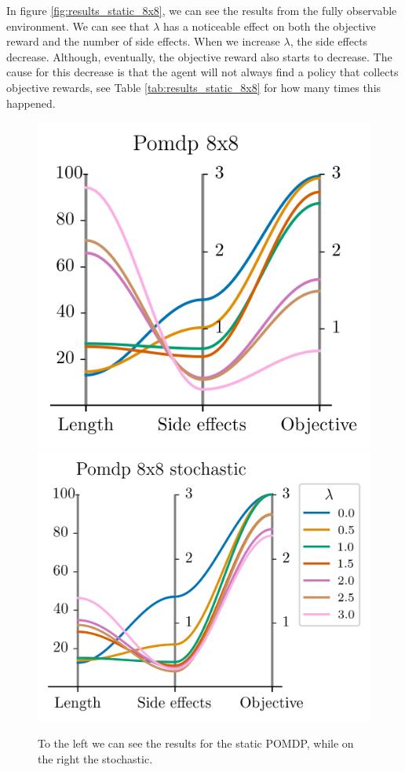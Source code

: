 \documentclass[12pt,A4]{report}
\theoremstyle{definition}
\begin{document}
In figure \ref{fig:results_static_8x8}, we can see the results from the fully observable environment. We can see that $\lambda$ has a noticeable effect on both the objective reward and the number of side effects. When we increase $\lambda$, the side effects decrease. Although, eventually,  the objective reward also starts to decrease. The cause for this decrease is that the agent will not always find a policy that collects objective rewards, see Table \ref{tab:results_static_8x8} for how many times this happened. 
\begin{figure}[H]
  \centering
  \includegraphics{"./figures/pomdp_8x8_results.png"}
  \includegraphics{"./figures/pomdp_8x8_stochastic_results.png"}
  \caption{To the left we can see the results for the static POMDP, while on the right the stochastic.}
  \label{fig:results_pomdp_8x8}
\end{figure}
\end{document}
